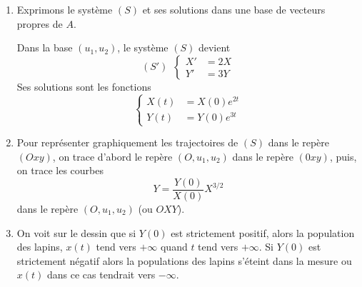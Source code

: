 {{\begin {enumerate}
$$\begin{pmatrix}2x \\  2y\end{pmatrix}\iff x=y,$$
d'o\`u le vecteur propre $u_1=(1,1)$ associ\'e \`a la valeur propre $\lambda_1=2$ . 
$$\begin{pmatrix}4&-2 \\ 1&1 \\ \end{pmatrix}\begin{pmatrix}x \\  y\end{pmatrix}=
\begin{pmatrix}3x \\  3y\end{pmatrix}\iff x=2y,$$
d'o\`u le vecteur propre $u_2=(2,1)$ associ\'e \`a la valeur propre $\lambda_2=3$ .
Dans la base $(u_1, u_2)$, la matrice s'\'ecrit
$$A'=\begin{pmatrix}2&0 \\ 0&3 \\ \end{pmatrix}.$$
On a $A=PA'P^{-1}$ o\`u
$$P=\begin{pmatrix}1&2 \\ 1&1 \\  \end{pmatrix}\ {\hbox{et}}\ P^{-1}=\begin{pmatrix}-1&2 \\ 1&-1 \\ \end{pmatrix}.$$
  \item Exprimons le syst\`eme $(S)$ et ses solutions dans une base de vecteurs propres de $A$.

Dans la base $(u_1, u_2)$, le syst\`eme $(S)$ devient
$$(S')\ \ \left\{\begin{align*}X'&= 2X \\  Y'&= 3Y\end{align*}\right.$$
Ses solutions sont les fonctions
$$\left\{\begin{align*}X(t)&= X(0)e^{2t} \\  Y(t)&=Y(0)e^{3t}\end{align*}\right.$$

  \item  Pour repr\'esenter graphiquement les trajectoires de $(S)$ dans le rep\`ere $(Oxy)$, on trace d'abord le rep\`ere $(O, u_1,u_2)$ dans le rep\`ere $(0xy)$, puis, on trace les courbes $$Y={\frac{Y(0)}{X(0)}}X^{3/2}$$
dans le rep\`ere $(O, u_1,u_2)$ (ou $OXY$).

  \item On voit sur le dessin que si $Y(0)$ est strictement positif, alors la population des lapins, $x(t)$ tend vers $+\infty$ quand $t$ tend vers $+\infty$. Si $Y(0)$ est strictement n\'egatif alors la populations des lapins s'\'eteint dans la mesure ou $x(t)$ dans ce cas tendrait vers $-\infty$.
\end {enumerate}}
}